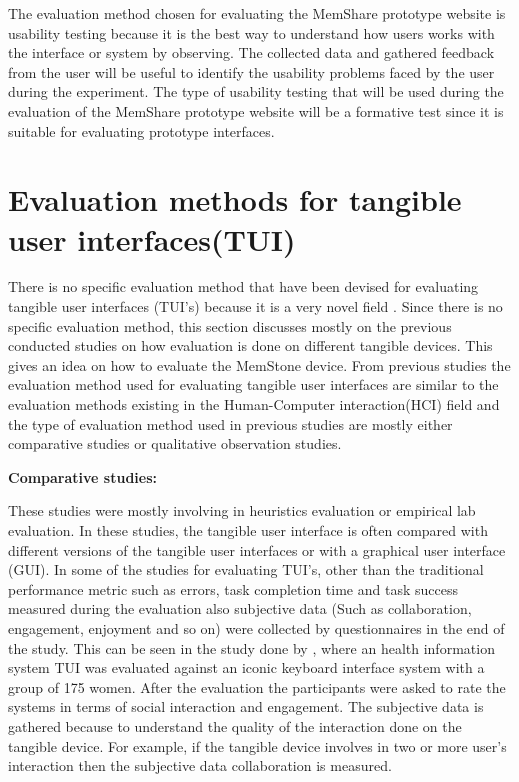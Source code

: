 \documentclass[mscthesis]{usiinfthesis}
\begin{document}
The evaluation method chosen for evaluating the MemShare prototype website is usability testing because it is the best way to understand how users works with the interface or system by observing. The collected data and gathered feedback from the user will be useful to identify the usability problems faced by the user during the experiment. The type of usability testing that will be used during the evaluation of the MemShare prototype website will be a formative test since it is suitable for evaluating prototype interfaces. 

\section{Evaluation methods for tangible user interfaces(TUI)}
There is no specific evaluation method that have been devised for evaluating tangible user interfaces (TUI's) because it is a very novel field \citep{shaer_tangible_2009}. Since there is no specific evaluation method, this section discusses mostly on the previous conducted studies on how evaluation is done on different tangible devices. This gives an idea on how to evaluate the MemStone device. From previous studies the evaluation method used for evaluating tangible user interfaces are similar to the evaluation methods existing in the Human-Computer interaction(HCI) field and the type of evaluation method used in previous studies are mostly either comparative studies or qualitative observation studies.
\newline

\textbf{Comparative studies:}

These studies were mostly involving in heuristics evaluation or empirical lab evaluation. In these studies, the tangible user interface is often compared with different versions of the tangible user interfaces or with a graphical user interface (GUI). In some of the studies for evaluating TUI's, other than the traditional performance metric such as errors, task completion time and task success measured during the evaluation also subjective data (Such as collaboration, engagement, enjoyment and so on) were collected by questionnaires in the end of the study. This can be seen in the study done by \citeauthor{parmar_tangible_2009}, where an health information system TUI was evaluated against an iconic keyboard interface system with a group of 175 women. After the evaluation the participants were asked to rate the systems in terms of social interaction and engagement. The subjective data is gathered because to understand the quality of the interaction done on the tangible device. For example, if the tangible device involves in two or more user's interaction then the subjective data collaboration is measured.
\newline
\end{document}
